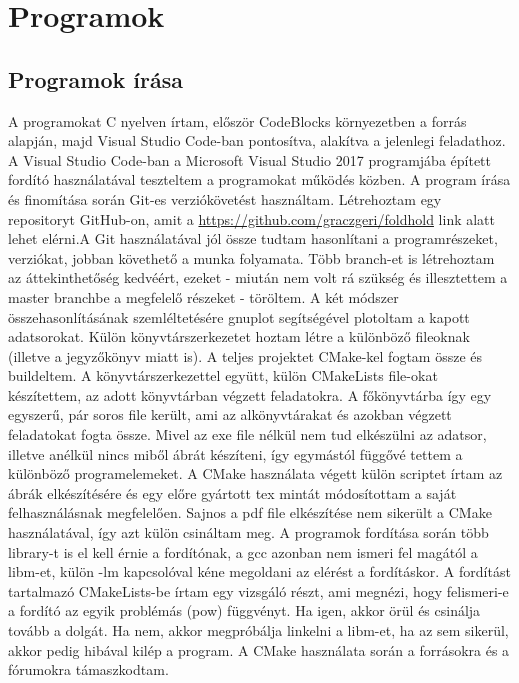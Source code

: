 \documentclass[a4paper, 12pt]{article}
\begin{document}
\section{Programok}
\label{sec:prog}

\subsection{Programok írása}
\label{progiras}

A programokat C nyelven írtam, először CodeBlocks környezetben a \cite{artic:negyedik} forrás alapján, majd Visual Studio Code-ban pontosítva, alakítva a jelenlegi feladathoz. A Visual Studio Code-ban a Microsoft Visual Studio 2017 programjába épített fordító használatával teszteltem a programokat működés közben. A program írása és finomítása során Git-es verziókövetést használtam. Létrehoztam egy repositoryt GitHub-on, amit a \url{https://github.com/graczgeri/foldhold} link alatt lehet elérni.A Git használatával jól össze tudtam hasonlítani a programrészeket, verziókat, jobban követhető a munka folyamata. Több branch-et is létrehoztam az áttekinthetőség kedvéért, ezeket - miután nem volt rá szükség és illesztettem a master branchbe a megfelelő részeket - töröltem. A két módszer összehasonlításának szemléltetésére gnuplot segítségével plotoltam a kapott adatsorokat. Külön könyvtárszerkezetet hoztam létre a különböző fileoknak (illetve a jegyzőkönyv miatt is). A teljes projektet CMake-kel fogtam össze és buildeltem. A könyvtárszerkezettel együtt, külön CMakeLists file-okat készítettem, az adott könyvtárban végzett feladatokra. A főkönyvtárba így egy egyszerű, pár soros file került, ami az alkönyvtárakat és azokban végzett feladatokat fogta össze. Mivel az exe file nélkül nem tud elkészülni az adatsor, illetve anélkül nincs miből ábrát készíteni, így egymástól függővé tettem a különböző programelemeket. A CMake használata végett külön scriptet írtam az ábrák elkészítésére és egy előre gyártott tex mintát módosítottam a saját felhasználásnak megfelelően. Sajnos a pdf file elkészítése nem sikerült a CMake használatával, így azt külön csináltam meg. A programok fordítása során több library-t is el kell érnie a fordítónak, a gcc azonban nem ismeri fel magától a libm-et, külön -lm kapcsolóval kéne megoldani az elérést a fordításkor. A fordítást tartalmazó CMakeLists-be írtam egy vizsgáló részt, ami megnézi, hogy felismeri-e a fordító az egyik problémás (pow) függvényt. Ha igen, akkor örül és csinálja tovább a dolgát. Ha nem, akkor megpróbálja linkelni a libm-et, ha az sem sikerül, akkor pedig hibával kilép a program. A CMake használata során a \cite{artic:elso,artic:masodik} forrásokra és a \cite{artic:otodik,artic:hatodik} fórumokra támaszkodtam.\label{subsec:euler_1}
\end{document}

